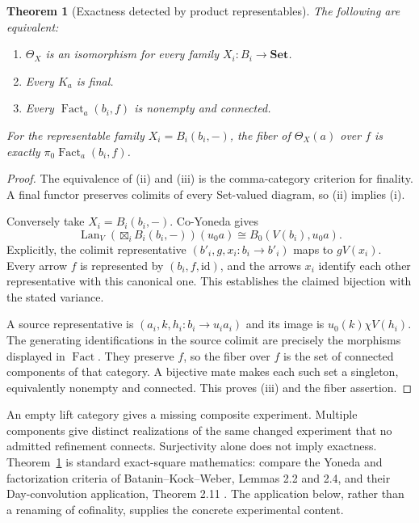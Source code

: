 \documentclass[11pt]{article}
\newtheorem{theorem}{Theorem}[section]
\theoremstyle{definition}\newtheorem{definition}[theorem]{Definition}
\theoremstyle{remark}\newtheorem{remark}[theorem]{Remark}
\newcommand{\Set}{\mathbf{Set}}
\newcommand{\Lan}{\operatorname{Lan}}
\newcommand{\Fact}{\operatorname{Fact}}
\newcommand{\id}{\mathrm{id}}
\begin{document}
\begin{theorem}[Exactness detected by product representables]\label{thm:set}
The following are equivalent:
\begin{enumerate}[label=(\roman*)]
\item $\Theta_X$ is an isomorphism for every family $X_i:B_i\to\Set$.
\item Every $K_a$ is final.
\item Every $\Fact_a(b_i,f)$ is nonempty and connected.
\end{enumerate}
For the representable family $X_i=B_i(b_i,-)$, the fiber of
$\Theta_X(a)$ over $f$ is exactly $\pi_0\Fact_a(b_i,f)$.
\end{theorem}
\begin{proof}
The equivalence of (ii) and (iii) is the comma-category criterion for
finality. A final functor preserves colimits of every Set-valued diagram,
so (ii) implies (i).

Conversely take $X_i=B_i(b_i,-)$. Co-Yoneda gives
\[
 \Lan_V(\mathop{\boxtimes}_i B_i(b_i,-))(u_0a)
       \cong B_0(V(b_i),u_0a).
\]
Explicitly, the colimit representative
$(b'_i,g,x_i:b_i\to b'_i)$ maps to $gV(x_i)$. Every arrow $f$ is
represented by $(b_i,f,\id)$, and the arrows $x_i$ identify each other
representative with this canonical one. This establishes the claimed
bijection with the stated variance.

A source representative is $(a_i,k,h_i:b_i\to u_i a_i)$ and its image
is $u_0(k)\chi V(h_i)$. The generating identifications in the source
colimit are precisely the morphisms displayed in $\Fact$. They preserve
$f$, so the fiber over $f$ is the set of connected components of that
category. A bijective mate makes each such set a singleton, equivalently
nonempty and connected. This proves (iii) and the fiber assertion.
\end{proof}

An empty lift category gives a missing composite experiment. Multiple
components give distinct realizations of the same changed experiment
that no admitted refinement connects. Surjectivity alone does not imply
exactness. Theorem~\ref{thm:set} is standard exact-square mathematics:
compare the Yoneda and factorization criteria of
Batanin--Kock--Weber, Lemmas 2.2 and 2.4, and their Day-convolution
application, Theorem 2.11 \cite{BKW}. The application below, rather than
a renaming of cofinality, supplies the concrete experimental content.
\end{document}
